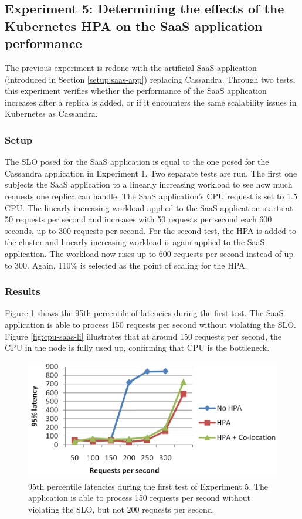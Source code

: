 \subsection{Experiment 5: Determining the effects of the Kubernetes HPA on the SaaS application performance}
The previous experiment is redone with the artificial SaaS application (introduced in Section \ref{setup:saas-app}) replacing Cassandra. Through two tests, this experiment verifies whether the performance of the SaaS application increases after a replica is added, or if it encounters the same scalability issues in Kubernetes as Cassandra.  

\subsubsection{Setup}
The SLO posed for the SaaS application is equal to the one posed for the Cassandra application in Experiment 1. Two separate tests are run. The first one subjects the SaaS application to a linearly increasing workload to see how much requests one replica can handle. The SaaS application's CPU request is set to 1.5 CPU. The linearly increasing workload applied to the SaaS application starts at 50 requests per second and increases with 50 requests per second each 600 seconds, up to 300 requests per second. For the second test, the HPA is added to the cluster and linearly increasing workload is again applied to the SaaS application. The workload now rises up to 600 requests per second instead of up to 300. Again, 110\% is selected as the point of scaling for the HPA. 


\subsubsection{Results}
Figure \ref{fig:lat-saas-li} shows the 95th percentile of latencies during the first test. The SaaS application is able to process 150 requests per second without violating the SLO. Figure \ref{fig:cpu-saas-li} illustrates that at around 150 requests per second, the CPU in the node is fully used up, confirming that CPU is the bottleneck. 

\begin{figure}
\centering
\includegraphics[width=0.95\columnwidth]{Images/Experiments/CPU/Latencies/lat-exp5-7.PNG}
\caption{95th percentile latencies during the first test of Experiment 5. The application is able to process 150 requests per second without violating the SLO, but not 200 requests per second.}
\label{fig:lat-saas-li}
\end{figure}

